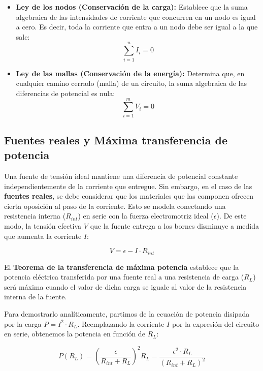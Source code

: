 \documentclass[11pt]{article}
\begin{document}
\begin{itemize}
    \item \textbf{Ley de los nodos (Conservación de la carga):} Establece que la suma algebraica de las intensidades de corriente que concurren en un nodo es igual a cero. Es decir, toda la corriente que entra a un nodo debe ser igual a la que sale:
    \begin{equation}
    \sum_{i=1}^{n} I_i = 0
    \end{equation}

    \item \textbf{Ley de las mallas (Conservación de la energía):} Determina que, en cualquier camino cerrado (malla) de un circuito, la suma algebraica de las diferencias de potencial es nula:
    \begin{equation}
    \sum_{i=1}^{m} V_i = 0
    \end{equation}
\end{itemize}

\subsection{Fuentes reales y Máxima transferencia de potencia}
Una fuente de tensión ideal mantiene una diferencia de potencial constante independientemente de la corriente que entregue. Sin embargo, en el caso de las \textbf{fuentes reales}, se debe considerar que los materiales que las componen ofrecen cierta oposición al paso de la corriente. Esto se modela conectando una resistencia interna ($R_{int}$) en serie con la fuerza electromotriz ideal ($\epsilon$). De este modo, la tensión efectiva $V$ que la fuente entrega a los bornes disminuye a medida que aumenta la corriente $I$:

\begin{equation}
V = \epsilon - I \cdot R_{int}
\end{equation}

El \textbf{Teorema de la transferencia de máxima potencia} establece que la potencia eléctrica transferida por una fuente real a una resistencia de carga ($R_L$) será máxima cuando el valor de dicha carga se iguale al valor de la resistencia interna de la fuente.

Para demostrarlo analíticamente, partimos de la ecuación de potencia disipada por la carga $P = I^2 \cdot R_L$. Reemplazando la corriente $I$ por la expresión del circuito en serie, obtenemos la potencia en función de $R_L$:

\begin{equation*}
P(R_L) = \left( \frac{\epsilon}{R_{int} + R_L} \right)^2 R_L = \frac{\epsilon^2 \cdot R_L}{(R_{int} + R_L)^2}
\end{equation*}
\end{document}
